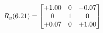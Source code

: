 \documentclass[preview]{standalone}
\begin{document}
\begin{align*}
\special{dvisvgm:raw <g id='unique000'>}R_{y}(6.21) = \begin{bmatrix}+1.00 & 0 & -0.07 \\0 & 1 & 0 \\+0.07 & 0 & +1.00\end{bmatrix}\special{dvisvgm:raw </g>}
\end{align*}
\end{document}
